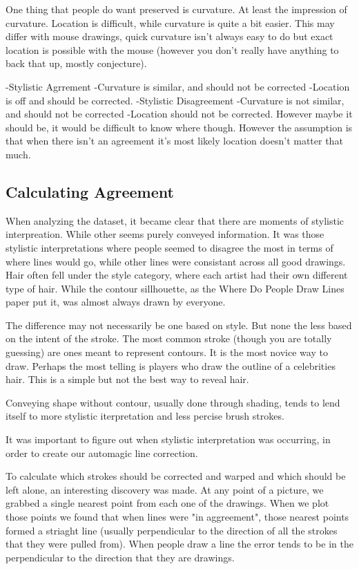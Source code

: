 One thing that people do want preserved is curvature. At least the impression of curvature. Location is difficult, while curvature is quite a bit easier. This may differ with mouse drawings, quick curvature isn't always easy to do but exact location is possible with the mouse (however you don't really have anything to back that up, mostly conjecture).

-Stylistic Agrrement
	-Curvature is similar, and should not be corrected
	-Location is off and should be corrected.
-Stylistic Disagreement
	-Curvature is not similar, and should not be corrected
	-Location should not be corrected. However maybe it should be, it would be difficult to know where though. However the assumption is that when there isn't an agreement it's most likely location doesn't matter that much.

\subsection{Calculating Agreement}
When analyzing the dataset, it became clear that there are moments of stylistic interpreation. While other seems purely conveyed information. It was those stylistic interpretations where people seemed to disagree the most in terms of where lines would go, while other lines were consistant across all good drawings. Hair often fell under the style category, where each artist had their own different type of hair. While the contour sillhouette, as the Where Do People Draw Lines paper put it, was almost always drawn by everyone. 

The difference may not necessarily be one based on style. But none the less based on the intent of the stroke. The most common stroke (though you are totally guessing) are ones meant to represent contours. It is the most novice way to draw. Perhaps the most telling is players who draw the outline of a celebrities hair. This is a simple but not the best way to reveal hair. 

Conveying shape without contour, usually done through shading, tends to lend itself to more stylistic iterpretation and less percise brush strokes. 

It was important to figure out when stylistic interpretation was occurring, in order to create our automagic line correction. 

To calculate which strokes should be corrected and warped and which should be left alone, an interesting discovery was made. At any point of a picture, we grabbed a single nearest point from each one of the drawings. When we plot those points we found that when lines were "in aggreement", those nearest points formed a striaght line (usually perpendicular to the direction of all the strokes that they were pulled from). When people draw a line the error tends to be in the perpendicular to the direction that they are drawings.

